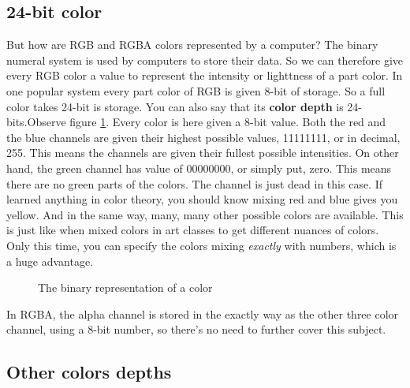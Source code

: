 \subsection{24-bit color}
\label{sec:24-bit-color}

But how are RGB and RGBA colors represented by a computer? The binary
numeral system is used by computers to store their data. So we can
therefore give every RGB color a value to represent the intensity or
lighttness of a part color. In one popular system every part color of
RGB is given 8-bit of storage. So a full color takes 24-bit is
storage. You can also say that its \textbf{color depth}
 is 24-bits.Observe figure \ref{fig:rgb-bits}. Every color is
here given a 8-bit value. Both the red and the blue channels are given
their highest possible values, 11111111, or in decimal, 255. This
means the channels are given their fullest possible intensities. On
other hand, the green channel has value of 00000000, or simply put,
zero. This means there are no green parts of the colors. The channel
is just dead in this case. If learned anything in color theory, you
should know mixing red and blue gives you yellow. And in the same way,
many, many other possible colors are available. This is just like when
mixed colors in art classes to get different nuances of colors. Only
this time, you can specify the colors mixing \emph{exactly} with
numbers, which is a huge advantage.


\begin{figure}[h]
  \centering
  \newcommand{\bitbox}[3]{
    \filldraw[fill=#2!80!white,draw=black] (#1,0) +(-.2,-.2) rectangle ++(.2,.2);
    \draw (#1,0) node{#3};
  }
  \caption{The binary representation of a color}
  \label{fig:rgb-bits}
\end{figure}


In RGBA, the alpha channel is stored in the exactly way as the other
three color channel, using a 8-bit number, so there's no need to
further cover this subject.

\subsection{Other colors depths}
\label{sec:other-colors-depths}

